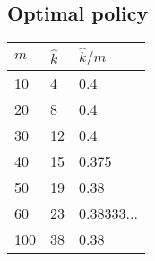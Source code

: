 \documentclass[a4paper, english, 10pt]{article}
\begin{document}
\subsection{Optimal policy}

\begin{tabular}{lll}
  \toprule
  $m$ & $\hat{k}$ & $\hat{k} / m$\\
  \midrule
  10 & 4 & 0.4\\
  20 & 8 & 0.4\\
  30 & 12 & 0.4\\
  40 & 15 & 0.375\\
  50 & 19 & 0.38\\
  60 & 23 & 0.38333...\\
  100 & 38 & 0.38\\
  \bottomrule
\end{tabular}



% 
% 
\end{document}
